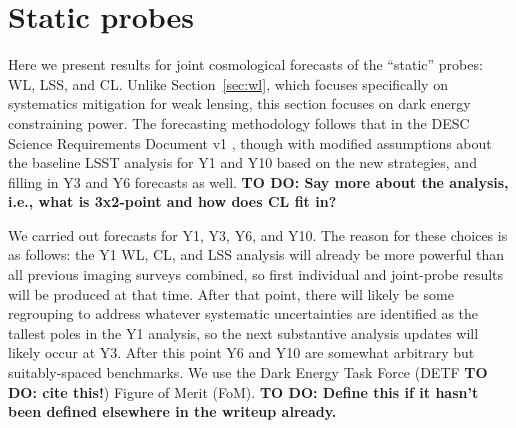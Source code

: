 \section{Static probes}

\newcommand{\todorm}[1]{\textbf{TO DO: #1}}

Here we present results for joint cosmological forecasts of the ``static'' probes: WL, LSS, and CL.
Unlike Section~\ref{sec:wl}, which focuses specifically on systematics mitigation for weak lensing,
this section focuses on dark energy constraining power.  The forecasting methodology follows
that in the DESC Science Requirements Document v1 \cite{DESCSRD2018}, though with modified
assumptions about the baseline LSST analysis for Y1 and Y10 based on the new strategies, and filling
in Y3 and Y6 forecasts as well. 
\todorm{Say more about the analysis, i.e., what is 3x2-point and how does CL fit in?}

We carried out forecasts for Y1, Y3, Y6, and Y10.  The reason for these choices is as follows: the
Y1 WL, CL, and LSS analysis will already be more powerful than all previous imaging surveys
combined, so first individual and joint-probe results will be produced at that time.  After that
point, there will likely be some regrouping to address whatever systematic uncertainties are
identified as the tallest poles in the Y1 analysis, so the next substantive analysis updates will
likely occur at Y3.  After this point Y6 and Y10 are somewhat arbitrary but suitably-spaced
benchmarks.  We use the Dark Energy Task Force (DETF \todorm{cite this!}) Figure of Merit
(FoM). \todorm{Define this if it hasn't been defined elsewhere in the writeup already.}

